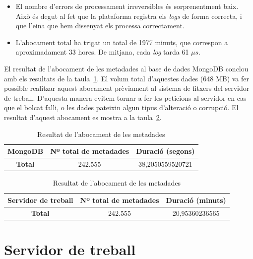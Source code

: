 \documentclass[lettersize,journal]{IEEEtran}
\begin{document}
\begin{itemize}
    \item El nombre d'errors de processament irreversibles és sorprenentment baix.
    Això és degut al fet que la plataforma registra els \textit{logs} de forma correcta, i que l'eina que hem dissenyat els processa correctament.
    \item L'abocament total ha trigat un total de 1977 minuts, que correspon a aproximadament 33 hores.
    De mitjana, cada \textit{log} tarda 61 \(\mu s\).
\end{itemize}

El resultat de l'abocament de les metadades al base de dades MongoDB conclou amb els resultats de la taula~\ref{tab:table2}.
El volum total d'aquestes dades (648 MB) va fer possible realitzar aquest abocament prèviament al sistema de fitxers del servidor de treball.
D'aquesta manera evitem tornar a fer les peticions al servidor en cas que el bolcat falli, o les dades pateixin algun tipus d'alteració o corrupció.
El resultat d'aquest abocament es mostra a la taula~\ref{tab:table3}.

\begin{table}[!t]
    \caption{Resultat de l'abocament de les metadades\label{tab:table2}}
    \centering
    \begin{tabular}{|c|c|c|}
        \hline
        MongoDB & Nº total de metadades & Duració (segons)\\
        \hline
        \textbf{Total} & 242.555 & 38,2050559520721\\
        \hline
    \end{tabular}
\end{table}

\begin{table}[!t]
    \caption{Resultat de l'abocament de les metadades\label{tab:table3}}
    \centering
    \begin{tabular}{|c|c|c|}
        \hline
        Servidor de treball & Nº total de metadades & Duració (minuts)\\
        \hline
        \textbf{Total} & 242.555 & 20,95360236565\\
        \hline
    \end{tabular}
\end{table}

\section{Servidor de treball}\label{sec:server-ostia}
\lipsum[1]
\end{document}
